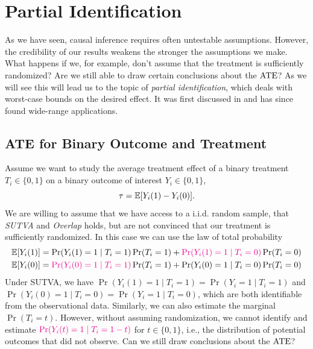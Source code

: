 \documentclass[11pt]{exam}
\begin{document}

\begingroup\small

\section{Partial Identification}
As we have seen, causal inference requires often untestable assumptions. However, the credibility of our results weakens the stronger the assumptions we make. What happens if we, for example, don't assume that the treatment is sufficiently randomized? Are we still able to draw certain conclusions about the $\mathrm{ATE}$? As we will see this will lead us to the topic of \emph{partial identification}, which deals with worst-case bounds on the desired effect. It was first discussed in \citet{manski1990nonparametric} and has since found wide-range applications.

\subsection{ATE for Binary Outcome and Treatment}
Assume we want to study the average treatment effect of a binary treatment $T_i \in \{0, 1\}$ on a binary outcome of interest $Y_i \in \{0, 1\}$,
\[
    \tau = \mathbb{E}[Y_i(1) - Y_i(0)].
\]
We are willing to assume that we have access to a i.i.d. random sample, that \emph{SUTVA} and \emph{Overlap} holds, but are not convinced that our treatment is sufficiently randomized. In this case we can use the law of total probability
\begin{align*}
    \mathbb{E}[Y_i(1)] &= \Pr(Y_i(1) = 1 \mid T_i = 1) \Pr(T_i = 1) + \textcolor{magenta}{\Pr(Y_i(1) = 1 \mid T_i = 0)} \Pr(T_i = 0)
    \\
    \mathbb{E}[Y_i(0)] &= \textcolor{magenta}{\Pr(Y_i(0) = 1 \mid T_i = 1)} \Pr(T_i = 1) + \Pr(Y_i(0) = 1 \mid T_i = 0) \Pr(T_i = 0)
\end{align*}
Under SUTVA, we have $\Pr(Y_i(1) = 1 \mid T_i = 1) = \Pr(Y_i = 1 \mid T_i = 1)$ and $\Pr(Y_i(0) = 1 \mid T_i = 0) = \Pr(Y_i = 1 \mid T_i = 0)$, which are both identifiable from the observational data. Similarly, we can also estimate the marginal $\Pr(T_i = t)$. However, without assuming randomization, we cannot identify and estimate $\textcolor{magenta}{\Pr(Y_i(t) = 1 \mid T_i = 1-t)}$ for $t \in \{0, 1\}$, i.e., the distribution of potential outcomes that did not observe. Can we still draw conclusions about the $\mathrm{ATE}$?
\end{document}
